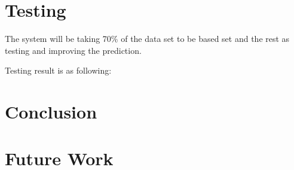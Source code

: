 \section{Testing}
The system will be taking 70\% of the data set to be based set and the rest as testing and improving the prediction.

Testing result is as following:

\section{Conclusion}
\section{Future Work}

